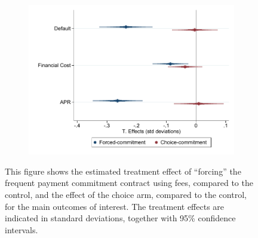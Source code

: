 \documentclass[oneside,11pt]{article}
\begin{document}
\cleardoublepage


\begin{figure}[H]
     \caption{Main treatment effects}
    \label{main_te}
    \begin{center}
    \begin{subfigure}{0.75\textwidth}
        \centering
        \includegraphics[width=\textwidth]{Figuras/main_te.pdf}
    \end{subfigure}
    \end{center}
    \scriptsize
    This figure shows the estimated treatment effect of ``forcing'' the frequent payment commitment contract using fees, compared to the control, and the effect of the choice arm, compared to the control, for the main outcomes of interest. The treatment effects are indicated in standard deviations, together with 95\% confidence intervals.
\end{figure}
\end{document}
